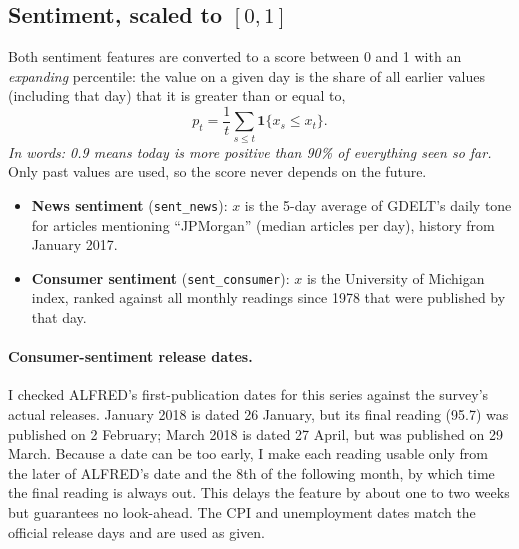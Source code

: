 \documentclass[11pt]{article}
\newcommand{\code}[1]{\texttt{#1}}
\begin{document}
\subsection{Sentiment, scaled to $[0,1]$}
Both sentiment features are converted to a score between 0 and 1 with an \emph{expanding} percentile: the value on a
given day is the share of all earlier values (including that day) that it is greater than or equal to,
\begin{equation}
  p_t = \frac{1}{t}\sum_{s \le t} \mathbf{1}\{x_s \le x_t\}.
\end{equation}
\emph{In words: 0.9 means today is more positive than 90\% of everything seen so far.} Only past values are used, so
the score never depends on the future.
\begin{itemize}
  \item \textbf{News sentiment} (\code{sent\_news}): $x$ is the 5-day average of GDELT's daily tone for articles
        mentioning ``JPMorgan'' (median \wGdeltarticlesmedian{} articles per day), history from January 2017.
  \item \textbf{Consumer sentiment} (\code{sent\_consumer}): $x$ is the University of Michigan index, ranked against
        all monthly readings since 1978 that were published by that day.
\end{itemize}

\paragraph{Consumer-sentiment release dates.}\label{sec:umcsent} I checked ALFRED's first-publication dates for this
series against the survey's actual releases. January 2018 is dated 26 January, but its final reading (95.7) was
published on 2 February; March 2018 is dated 27 April, but was published on 29 March. Because a date can be too early,
I make each reading usable only from the later of ALFRED's date and the 8th of the following month, by which time the
final reading is always out. This delays the feature by about one to two weeks but guarantees no look-ahead. The CPI
and unemployment dates match the official release days and are used as given.
\end{document}
